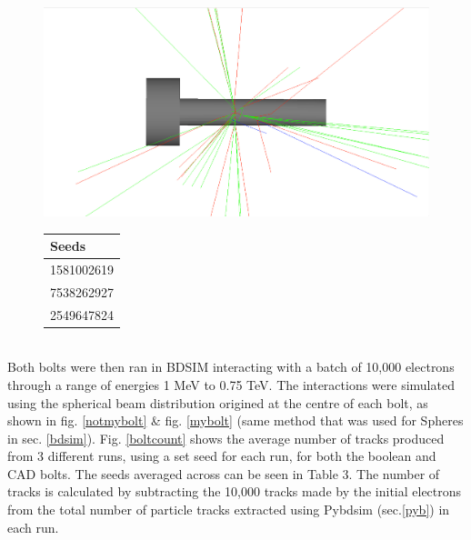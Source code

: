 \documentclass[12pt,a4paper]{article}
\begin{document}
\begin{figure}[h!]
\centering
\begin{minipage}{.5\textwidth}
  \centering
  \includegraphics[height=.5\linewidth]{Images//CAD_Screw//skinnybolt.png}
  \label{mybolt2}
\end{minipage}%
\begin{minipage}{.5\textwidth}
\centering
\begin{tabular}{|l|}
\hline
Seeds \\ \hline
1581002619\\ \hline
7538262927\\ \hline
2549647824\\ \hline
\end{tabular}
\vspace{1.6cm}
\label{tabbb}
\end{minipage}%
\end{figure}
\\
\noindent Both bolts were then ran in BDSIM interacting with a batch of 10,000 electrons through a range of energies 1 MeV to 0.75 TeV. The interactions were simulated using the spherical beam distribution origined at the centre of each bolt, as shown in fig. \ref{notmybolt} \& fig. \ref{mybolt} (same method that was used for Spheres in sec. \ref{bdsim}). Fig. \ref{boltcount} shows the average number of tracks produced from 3 different runs, using a set seed for each run, for both the boolean and CAD bolts. The seeds averaged across can be seen in Table 3. The number of tracks is calculated by subtracting the 10,000 tracks made by the initial electrons from the total number of particle tracks extracted using Pybdsim (sec.\ref{pyb}) in each run.
\end{document}
